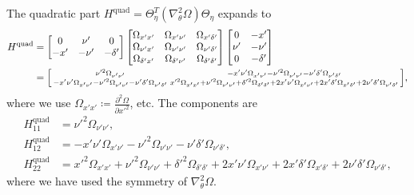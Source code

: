\documentclass{article}
\begin{document}
%
The quadratic part $H^{\text{quad}} = \Theta_\eta^T (\nabla_\theta^2 \Omega) \Theta_\eta$ expands to
%
\begin{align}
  H^{\text{quad}} & = \begin{bmatrix}
    0   & \nu'  & 0        \\
    -x' & -\nu' & -\delta'
  \end{bmatrix}
  \begin{bmatrix}
    \Omega_{x'x'}      & \Omega_{x'\nu'}      & \Omega_{x'\delta'}      \\
    \Omega_{\nu'x'}    & \Omega_{\nu'\nu'}    & \Omega_{\nu'\delta'}    \\
    \Omega_{\delta'x'} & \Omega_{\delta'\nu'} & \Omega_{\delta'\delta'}
  \end{bmatrix}
  \begin{bmatrix}
    0    & -x'      \\
    \nu' & -\nu'    \\
    0    & -\delta'
  \end{bmatrix}                      \\
                  & = \begin{bsmallmatrix}
    \nu'^2 \Omega_{\nu'\nu'} & -x'\nu'\Omega_{x'\nu'} - \nu'^2\Omega_{\nu'\nu'} - \nu'\delta'\Omega_{\nu'\delta'} \\
    -x'\nu'\Omega_{x'\nu'} - \nu'^2\Omega_{\nu'\nu'} - \nu'\delta'\Omega_{\nu'\delta'} & x'^2\Omega_{x'x'} + \nu'^2\Omega_{\nu'\nu'} + \delta'^2\Omega_{\delta'\delta'} + 2x'\nu'\Omega_{x'\nu'} + 2x'\delta'\Omega_{x'\delta'} + 2\nu'\delta'\Omega_{\nu'\delta'}
  \end{bsmallmatrix},
\end{align}
%
where we use $\Omega_{x'x'} \coloneqq \frac{\partial^2 \Omega}{\partial x'^2}$, etc.
The components are
%
\begin{align}
  H^{\text{quad}}_{11} & = \nu'^2 \Omega_{\nu'\nu'},                                                                                                                                                  \\
  H^{\text{quad}}_{12} & = -x'\nu'\Omega_{x'\nu'} - \nu'^2\Omega_{\nu'\nu'} - \nu'\delta'\Omega_{\nu'\delta'},                                                                                        \\
  H^{\text{quad}}_{22} & = x'^2\Omega_{x'x'} + \nu'^2\Omega_{\nu'\nu'} + \delta'^2\Omega_{\delta'\delta'} + 2x'\nu'\Omega_{x'\nu'} + 2x'\delta'\Omega_{x'\delta'} + 2\nu'\delta'\Omega_{\nu'\delta'},
\end{align}
%
where we have used the symmetry of $\nabla_\theta^2 \Omega$.
\end{document}

